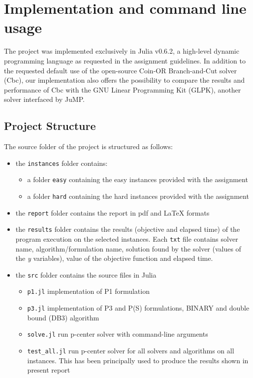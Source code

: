\newpage
\chapter{Implementation and command line usage}

The project was implemented exclusively in Julia v0.6.2, a high-level dynamic programming language as requested in the assignment guidelines. In addition to the requested default use of the open-source Coin-OR Branch-and-Cut solver (Cbc), our implementation also offers the possibility to compare the results and performance of Cbc with the GNU Linear Programming Kit (GLPK), another solver interfaced by JuMP.

\section{Project Structure}

The source folder of the project is structured as follows:
\begin{itemize}
\item the \verb+instances+ folder contains:
	\begin{itemize}
	\item a folder \verb+easy+ containing the easy instances provided with the assignment
	\item a folder \verb+hard+ containing the hard instances provided with the assignment
	\end{itemize}
\item the \verb+report+ folder contains the report in pdf and LaTeX formats
\item the \verb+results+ folder contains the results (objective and elapsed time) of the program execution on the selected instances.
Each \verb+txt+ file contains solver name, algorithm/formulation name,
solution found by the solver (values of the \textit{y} variables),
value of the objective function and elapsed time.
\item the \verb+src+ folder contains the source files in Julia
	\begin{itemize}
	\item \verb+p1.jl+ implementation of P1 formulation
	\item \verb+p3.jl+ implementation of P3 and P(S) formulations,
	BINARY and double bound (DB3) algorithm
	\item \verb+solve.jl+ run p-center solver with command-line arguments
	\item \verb+test_all.jl+ run p-center solver for all solvers and algorithms on all instances. This has been principally used
	to produce the results shown in present report
	\end{itemize}
\end{itemize}

